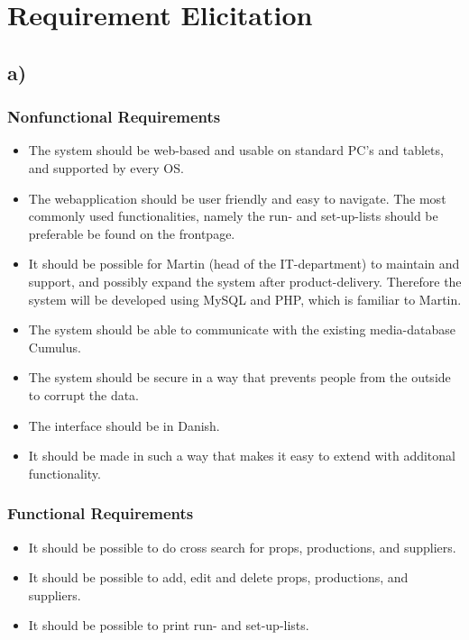 \documentclass[12pt]{article}
\begin{document}
\section{Requirement Elicitation}
\subsection{a)}
\subsubsection{Nonfunctional Requirements}
\begin{itemize}
  \item The system should be web-based and usable on standard PC's and tablets, and supported by every OS.
  \item The webapplication should be user friendly and easy to navigate. The most commonly used functionalities, namely the run- and set-up-lists should be preferable be found on the frontpage.
  \item It should be possible for Martin (head of the IT-department) to maintain and support, and possibly expand the system after product-delivery. Therefore the system will be developed using MySQL and PHP, which is familiar to Martin.
  \item The system should be able to communicate with the existing media-database Cumulus.
  \item The system should be secure in a way that prevents people from the outside to corrupt the data.
  \item The interface should be in Danish.
  \item It should be made in such a way that makes it easy to extend with additonal functionality.
\end{itemize}
\subsubsection{Functional Requirements}
\begin{itemize}
  \item It should be possible to do cross search for props, productions, and suppliers.
  \item It should be possible to add, edit and delete props, productions, and suppliers.
  \item It should be possible to print run- and set-up-lists.
\end{itemize}
\end{document}
